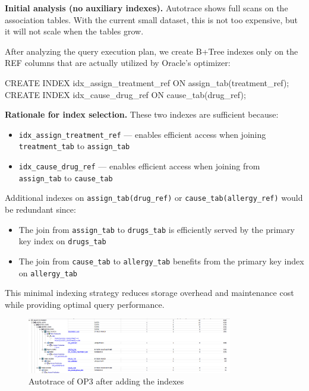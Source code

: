 \documentclass[11pt,a4paper]{article}
\begin{document}
\textbf{Initial analysis (no auxiliary indexes).} Autotrace shows full scans on the association tables. With the current small dataset, this is not too expensive, but it will not scale when the tables grow.  

After analyzing the query execution plan, we create B+Tree indexes only on the REF columns that are actually utilized by Oracle's optimizer:

\begin{sqlbox}
CREATE INDEX idx_assign_treatment_ref ON assign_tab(treatment_ref);
CREATE INDEX idx_cause_drug_ref       ON cause_tab(drug_ref);
\end{sqlbox}

\textbf{Rationale for index selection.} These two indexes are sufficient because:
\begin{itemize}
    \item \texttt{idx\_assign\_treatment\_ref} — enables efficient access when joining \texttt{treatment\_tab} to \texttt{assign\_tab}
    \item \texttt{idx\_cause\_drug\_ref} — enables efficient access when joining from \texttt{assign\_tab} to \texttt{cause\_tab}
\end{itemize}

Additional indexes on \texttt{assign\_tab(drug\_ref)} or \texttt{cause\_tab(allergy\_ref)} would be redundant since:
\begin{itemize}
    \item The join from \texttt{assign\_tab} to \texttt{drugs\_tab} is efficiently served by the primary key index on \texttt{drugs\_tab}
    \item The join from \texttt{cause\_tab} to \texttt{allergy\_tab} benefits from the primary key index on \texttt{allergy\_tab}
\end{itemize}

This minimal indexing strategy reduces storage overhead and maintenance cost while providing optimal query performance.

\begin{figure}[H]
  \centering
  \includegraphics[width=0.8\textwidth]{img/op3_autotrace_after.png}
  \caption{Autotrace of OP3 after adding the indexes}
\end{figure}
\end{document}
